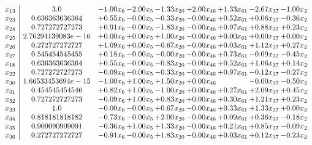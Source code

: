 \documentclass[8pt]{article}
\begin{document}
\[\begin{array}{c| c c@{\hskip 2pt} c@{\hskip 2pt} c@{\hskip 2pt} c@{\hskip 2pt} c@{\hskip 2pt} c@{\hskip 2pt} c@{\hskip 2pt} }
 x_{13}   &  3.0 & -1.00 x_{6} & -2.00 x_{5} & -1.33 x_{20} & +  2.00 x_{46} & +  1.33 x_{61} & -2.67 x_{37} & -1.00 x_{2}\\
 x_{23}   &  0.636363636364 & +  0.55 x_{6} & -0.00 x_{5} & -0.33 x_{20} & -0.00 x_{46} & +  0.52 x_{61} & +  0.06 x_{37} & -0.36 x_{2}\\
 x_{24}   &  0.727272727273 & +  0.91 x_{6} & -0.00 x_{5} & -1.83 x_{20} & -0.00 x_{46} & +  0.97 x_{61} & +  0.88 x_{37} & +  0.23 x_{2}\\
 x_{25}   &  2.76294139083e-16 & +  0.00 x_{6} & +  0.00 x_{5} & +  1.00 x_{20} & -0.00 x_{46} & +  0.00 x_{61} & +  0.00 x_{37} & +  0.00 x_{2}\\
 x_{26}   &  0.272727272727 & +  1.09 x_{6} & +  0.00 x_{5} & -0.67 x_{20} & -0.00 x_{46} & +  0.03 x_{61} & +  1.12 x_{37} & +  0.27 x_{2}\\
 x_{27}   &  0.545454545455 & +  0.18 x_{6} & -0.00 x_{5} & -0.00 x_{20} & -0.00 x_{46} & +  0.73 x_{61} & -0.09 x_{37} & -0.45 x_{2}\\
 x_{18}   &  0.636363636364 & +  0.55 x_{6} & -0.00 x_{5} & -0.83 x_{20} & -0.00 x_{46} & +  0.52 x_{61} & +  1.06 x_{37} & +  0.14 x_{2}\\
 x_{22}   &  0.727272727273 & -0.09 x_{6} & -0.00 x_{5} & -0.33 x_{20} & -0.00 x_{46} & +  0.97 x_{61} & -0.12 x_{37} & -0.27 x_{2}\\
 x_{30}   &  1.66533453694e-15 & -1.00 x_{6} & +  1.00 x_{5} & +  1.50 x_{20} & +  0.00 x_{46} &   & -0.00 x_{37} & -0.50 x_{2}\\
 x_{31}   &  0.454545454546 & +  0.82 x_{6} & +  1.00 x_{5} & -1.00 x_{20} & +  0.00 x_{46} & +  0.27 x_{61} & +  2.09 x_{37} & +  0.45 x_{2}\\
 x_{32}   &  0.727272727273 & -0.09 x_{6} & +  1.00 x_{5} & +  0.83 x_{20} & +  0.00 x_{46} & +  0.30 x_{61} & +  1.21 x_{37} & +  0.23 x_{2}\\
 x_{33}   &  1.0 & -0.00 x_{6} & -0.00 x_{5} & +  0.67 x_{20} & -0.00 x_{46} & +  0.33 x_{61} & +  1.33 x_{37} & +  0.00 x_{2}\\
 x_{34}   &  0.818181818182 & -0.73 x_{6} & -0.00 x_{5} & +  2.00 x_{20} & -0.00 x_{46} & +  0.09 x_{61} & +  0.36 x_{37} & -0.18 x_{2}\\
 x_{35}   &  0.909090909091 & -0.36 x_{6} & +  1.00 x_{5} & +  1.33 x_{20} & -0.00 x_{46} & +  0.21 x_{61} & +  0.85 x_{37} & -0.09 x_{2}\\
 x_{36}   &  0.272727272727 & -0.91 x_{6} & -0.00 x_{5} & +  1.83 x_{20} & -0.00 x_{46} & +  0.03 x_{61} & +  0.12 x_{37} & -0.23 x_{2}\\

\end{array}\]
\end{document}
